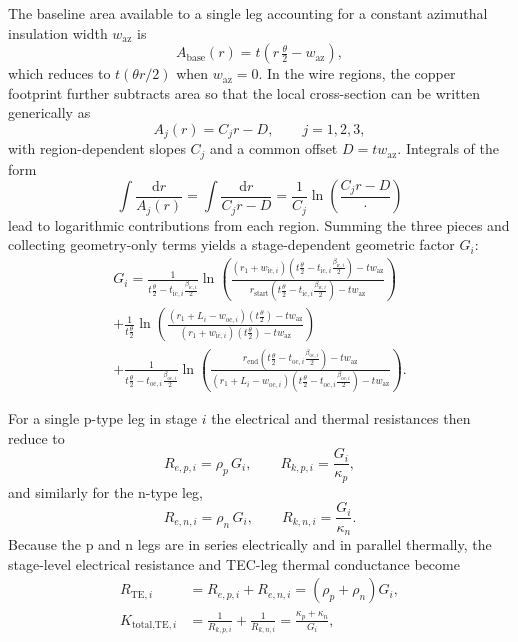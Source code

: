 \documentclass[conference]{IEEEtran}
\begin{document}
The baseline area available to a single leg accounting for a constant azimuthal insulation width $w_{\text{az}}$ is
\begin{equation}
	A_{\text{base}}(r) = t \left( r\,\tfrac{\theta}{2} - w_{\text{az}} \right),
\end{equation}
which reduces to $t (\theta r/2)$ when $w_{\text{az}} = 0$. In the wire regions, the copper footprint further subtracts area so that the local cross-section can be written generically as
\begin{equation}
	A_j(r) = C_j r - D, \qquad j=1,2,3,
\end{equation}
with region-dependent slopes $C_j$ and a common offset $D = t w_{\text{az}}$. Integrals of the form
\begin{equation}
	\int \frac{\mathrm{d}r}{A_j(r)} = \int \frac{\mathrm{d}r}{C_j r - D}
	= \frac{1}{C_j} \ln\!\left( \frac{C_j r - D}{\,\cdot\,} \right)
\end{equation}
lead to logarithmic contributions from each region. Summing the three pieces and collecting geometry-only terms yields a stage-dependent geometric factor $G_i$:
\begin{multline}
	G_i = \frac{1}{t\tfrac{\theta}{2} - t_{\text{ic},i}\tfrac{\beta_{\text{ic},i}}{2}}
	\ln\!\left( \frac{(r_1 + w_{\text{ic},i})(t\tfrac{\theta}{2} - t_{\text{ic},i}\tfrac{\beta_{\text{ic},i}}{2}) - t w_{\text{az}}}{r_{\text{start}}(t\tfrac{\theta}{2} - t_{\text{ic},i}\tfrac{\beta_{\text{ic},i}}{2}) - t w_{\text{az}}} \right) \\
	+ \frac{1}{t \tfrac{\theta}{2}}
	\ln\!\left( \frac{(r_1 + L_i - w_{\text{oc},i})(t \tfrac{\theta}{2}) - t w_{\text{az}}}{(r_1 + w_{\text{ic},i})(t \tfrac{\theta}{2}) - t w_{\text{az}}} \right) \\
	+ \frac{1}{t\tfrac{\theta}{2} - t_{\text{oc},i}\tfrac{\beta_{\text{oc},i}}{2}}
	\ln\!\left( \frac{r_{\text{end}}(t\tfrac{\theta}{2} - t_{\text{oc},i}\tfrac{\beta_{\text{oc},i}}{2}) - t w_{\text{az}}}{(r_1 + L_i - w_{\text{oc},i})(t\tfrac{\theta}{2} - t_{\text{oc},i}\tfrac{\beta_{\text{oc},i}}{2}) - t w_{\text{az}}} \right).
	\label{eq:G_i_def}
\end{multline}

For a single p-type leg in stage $i$ the electrical and thermal resistances then reduce to
\begin{equation}
	R_{e,p,i} = \rho_p \, G_i, \qquad
	R_{k,p,i} = \frac{G_i}{\kappa_p},
\end{equation}
and similarly for the n-type leg,
\begin{equation}
	R_{e,n,i} = \rho_n \, G_i, \qquad
	R_{k,n,i} = \frac{G_i}{\kappa_n}.
\end{equation}
Because the p and n legs are in series electrically and in parallel thermally, the stage-level electrical resistance and TEC-leg thermal conductance become
\begin{align}
	R_{\text{TE},i} &= R_{e,p,i} + R_{e,n,i} = (\rho_p + \rho_n) G_i,
	\label{eq:R_TE_i}\\
	K_{\text{total,TE},i} &= \frac{1}{R_{k,p,i}} + \frac{1}{R_{k,n,i}} = \frac{\kappa_p + \kappa_n}{G_i},
	\label{eq:K_total_TE_i}
\end{align}
\end{document}
